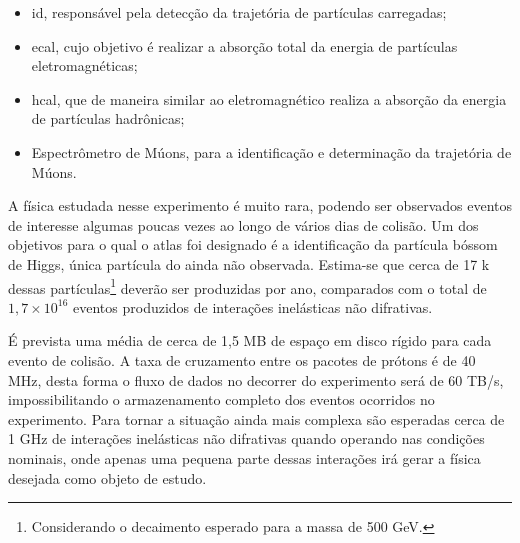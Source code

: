 
\begin{itemize}
\item \gls{id}, responsável pela detecção da trajetória de partículas carregadas;
\item \gls{ecal}, cujo objetivo é realizar a absorção total da
energia de partículas eletromagnéticas;
\item \gls{hcal}, que de maneira similar ao eletromagnético realiza a
absorção da energia de partículas hadrônicas;
\item Espectrômetro de Múons, para a identificação e determinação da trajetória de
Múons.
\end{itemize}

A física estudada nesse experimento é muito rara, podendo ser observados eventos
de interesse algumas poucas vezes ao longo de vários dias de colisão. 
Um dos objetivos para o qual o \gls{atlas} foi 
designado é a identificação da partícula bóssom de Higgs, única partícula 
do  ainda não observada. Estima-se que cerca de 17 k dessas
partículas\footnote{Considerando o decaimento esperado para a massa de 500 GeV.} deverão ser produzidas por ano, comparados
com o total de $1,7\times10^{16}$ eventos produzidos de interações inelásticas
não difrativas. 


É prevista uma média de cerca de 1,5 MB de espaço em disco rígido para cada evento de 
colisão. A taxa de cruzamento entre os pacotes de prótons é de 40 MHz, 
desta forma o fluxo de dados no decorrer do experimento será de 60 TB/s, impossibilitando o
armazenamento completo dos eventos ocorridos no experimento. Para tornar a
situação ainda mais complexa são esperadas cerca de 1 GHz de interações
inelásticas não difrativas quando operando nas condições nominais, onde apenas
uma pequena parte dessas interações irá gerar a física desejada como objeto de
estudo.

